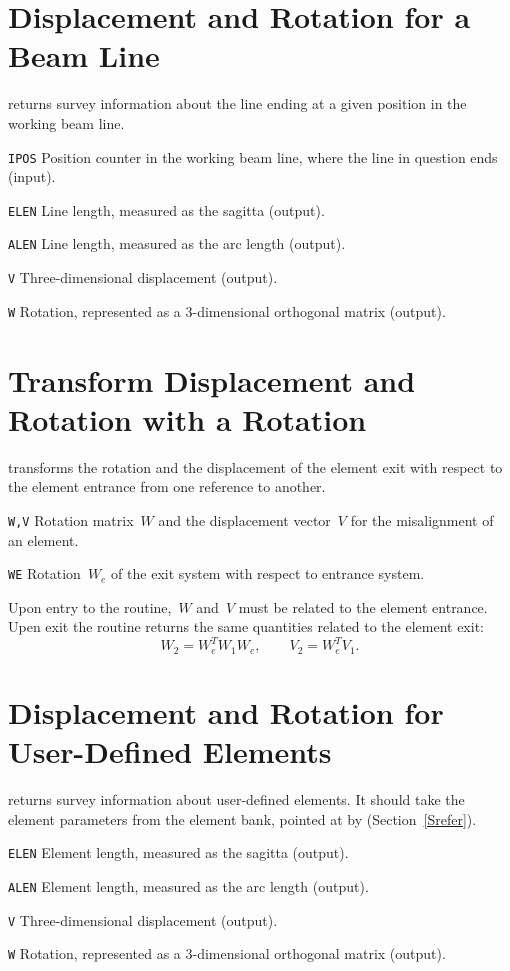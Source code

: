 \section{Displacement and Rotation for a Beam Line}
\label{SULINE}
returns survey information about the line ending at a given position
in the working beam line.
\begin{mylist}
\item[\tt IPOS]
Position counter in the working beam line, where the line in
question ends (input).
\item[\tt ELEN]
Line length, measured as the sagitta (output).
\item[\tt ALEN]
Line length, measured as the arc length (output).
\item[\tt V]
Three-dimensional displacement (output).
\item[\tt W]
Rotation, represented as a 3-dimensional orthogonal matrix
(output).
\end{mylist}

\section{Transform Displacement and Rotation with a Rotation}
\label{SUTRAN}
transforms the rotation and the displacement of the element exit with
respect to the element entrance from one reference to another.
\begin{mylist}
\item[\tt W,V]
Rotation matrix~$W$ and the displacement vector~$V$ for the
misalignment of an element.
\item[\tt WE]
Rotation~$W_e$ of the exit system with respect to entrance system.
\end{mylist}
Upon entry to the routine,~$W$ and~$V$ must be related to the element
entrance.
Upen exit the routine returns the same quantities related to the
element exit:
\[
W_2 = W_e^T W_1 W_e, \qquad V_2 = W_e^T V_1.
\]

\section{Displacement and Rotation for User-Defined Elements}
\label{SUUSER}
returns survey information about user-defined elements.
It should take the element parameters from the element bank,
pointed at by  (Section~\ref{Srefer}).
\begin{mylist}
\item[\tt ELEN]
Element length, measured as the sagitta (output).
\item[\tt ALEN]
Element length, measured as the arc length (output).
\item[\tt V]
Three-dimensional displacement (output).
\item[\tt W]
Rotation, represented as a 3-dimensional orthogonal matrix (output).
\end{mylist}

